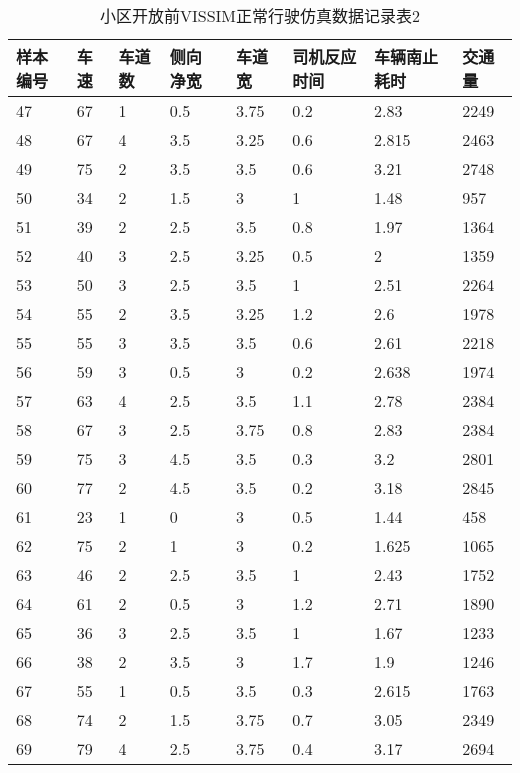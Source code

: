 \begin{table*}[h!]
  \centering
  \small
  \caption{小区开放前VISSIM正常行驶仿真数据记录表2}
  \begin{tabular*}{\linewidth}{p{40pt}<{\centering}p{30pt}<{\centering}
    p{30pt}<{\centering}p{40pt}<{\centering}p{50pt}<{\centering}p{70pt}<{\centering}
    p{60pt}<{\centering}p{50pt}<{\centering}}
    \toprule
    样本编号 &  车速 & 车道数  & 侧向 净宽 &  车道宽  &  司机反应时间  & 车辆南止耗时  &  交通量  \\
    \midrule
    47 & 67 & 1 & 0.5 & 3.75 & 0.2 & 2.83 & 2249 \\
    48 & 67 & 4 & 3.5 & 3.25 & 0.6 & 2.815 & 2463 \\
    49 & 75 & 2 & 3.5 & 3.5 & 0.6 & 3.21 & 2748 \\
    50 & 34 & 2 & 1.5 & 3 & 1 & 1.48 & 957 \\
    51 & 39 & 2 & 2.5 & 3.5 & 0.8 & 1.97 & 1364 \\
    52 & 40 & 3 & 2.5 & 3.25 & 0.5 & 2 & 1359 \\
    53 & 50 & 3 & 2.5 & 3.5 & 1 & 2.51 & 2264 \\
    54 & 55 & 2 & 3.5 & 3.25 & 1.2 & 2.6 & 1978 \\
    55 & 55 & 3 & 3.5 & 3.5 & 0.6 & 2.61 & 2218 \\
    56 & 59 & 3 & 0.5 & 3 & 0.2 & 2.638 & 1974 \\
    57 & 63 & 4 & 2.5 & 3.5 & 1.1 & 2.78 & 2384 \\
    58 & 67 & 3 & 2.5 & 3.75 & 0.8 & 2.83 & 2384 \\
    59 & 75 & 3 & 4.5 & 3.5 & 0.3 & 3.2 & 2801 \\
    60 & 77 & 2 & 4.5 & 3.5 & 0.2 & 3.18 & 2845 \\
    61 & 23 & 1 & 0 & 3 & 0.5 & 1.44 & 458 \\
    62 & 75 & 2 & 1 & 3 & 0.2 & 1.625 & 1065 \\
    63 & 46 & 2 & 2.5 & 3.5 & 1 & 2.43 & 1752 \\
    64 & 61 & 2 & 0.5 & 3 & 1.2 & 2.71 & 1890 \\
    65 & 36 & 3 & 2.5 & 3.5 & 1 & 1.67 & 1233 \\
    66 & 38 & 2 & 3.5 & 3 & 1.7 & 1.9 & 1246 \\
    67 & 55 & 1 & 0.5 & 3.5 & 0.3 & 2.615 & 1763 \\
    68 & 74 & 2 & 1.5 & 3.75 & 0.7 & 3.05 & 2349 \\
    69 & 79 & 4 & 2.5 & 3.75 & 0.4 & 3.17 & 2694 \\

\end{tabular*}
\end{table*}
